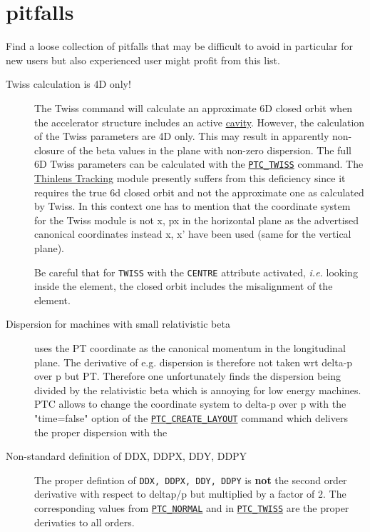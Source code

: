 
\chapter{\madx pitfalls}

Find a loose collection of pitfalls that may be difficult to avoid in
particular for new users but also experienced user might profit from
this list.  


\begin{description}

\item[Twiss calculation is 4D only!]  The Twiss command will calculate
  an approximate 6D closed orbit when the accelerator structure includes
  an active \hyperref[sec:rf-cavity]{cavity}. However, the calculation of
  the Twiss parameters are 4D only. This may result in apparently
  non-closure of the beta values in the plane with non-zero
  dispersion. The full 6D Twiss parameters can be calculated with the
  \hyperref[chap:ptc-twiss]{\texttt{PTC\_TWISS}} command.  The
  \hyperref[chap:thintrack]{Thinlens Tracking} module presently suffers
  from this deficiency since it requires the true 6d closed orbit and
  not the approximate one as calculated by Twiss. In this context one
  has to mention that the coordinate system for the Twiss module is not
  x, px in the horizontal plane as the advertised canonical coordinates
  instead x, x' have been used (same for the vertical plane).
  
  Be careful that for \texttt{TWISS} with the \texttt{CENTRE} attribute
  activated, \textsl{i.e.} looking inside the element, the closed orbit
  includes the misalignment of the element.  

  
\item[Dispersion for machines with small relativistic beta] 
  \madx uses the PT coordinate as the canonical momentum in the
  longitudinal plane. The derivative of e.g. dispersion is therefore
  not taken wrt delta-p over p but PT. Therefore one unfortunately finds the
  dispersion being divided by the relativistic beta which is annoying
  for low energy machines. PTC allows to change the coordinate system
  to  delta-p over p with the "time=false" option of the
  \hyperref[sec:ptc-create-layout]{\texttt{PTC\_CREATE\_LAYOUT}}
  command which delivers the proper dispersion with the


\item[Non-standard definition of DDX, DDPX, DDY, DDPY] 
  The \madx proper defintion of \texttt{DDX, DDPX, DDY, DDPY} is
  \textbf{not} the second order derivative with respect to deltap/p but
  multiplied by a factor of 2. The corresponding values from
  \hyperref[chap:ptc-normal]{\texttt{PTC\_NORMAL}} and in
  \hyperref[chap:ptc-twiss]{\texttt{PTC\_TWISS}} are the proper
  derivaties to all orders. 
  


\end{description}
